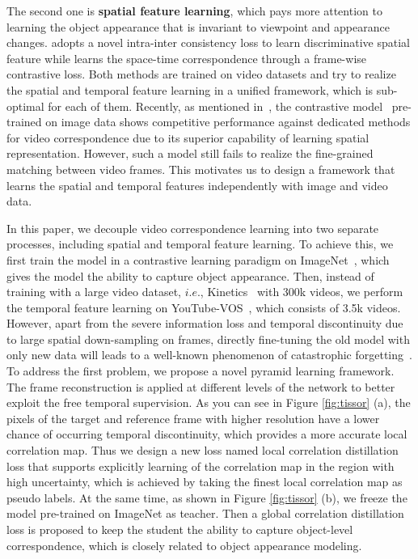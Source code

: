 \documentclass{article}
\begin{document}
The second one is \textbf{spatial feature learning}, which pays more attention to learning the object appearance that is invariant to viewpoint and appearance changes. \cite{wang2020contrastive} adopts a novel intra-inter consistency loss to learn  discriminative spatial feature while \cite{xu2021rethinking} learns the space-time correspondence through a frame-wise contrastive loss. Both methods are trained on video datasets and try to realize the spatial and temporal feature learning in a unified framework, which is sub-optimal for each of them. Recently, as mentioned in~\cite{wang2021different}, the contrastive model~\cite{he2020momentum}\cite{xie2021detco} pre-trained on image data shows competitive performance against dedicated methods for video correspondence due to its superior capability of learning spatial representation. However,  such a model still fails to realize the fine-grained matching between video frames. This motivates us to design a framework that learns the spatial and temporal features independently with image and video data.  

In this paper, we decouple video correspondence learning into two separate processes, including spatial and temporal feature learning. To achieve this, we first train the model in a contrastive learning paradigm on ImageNet~\cite{deng2009large}, which gives the model the ability to capture object appearance. Then, instead of training with a large video dataset, $i.e.$, Kinetics~\cite{carreira2017quo} with 300k videos, we perform the temporal feature learning on YouTube-VOS~\cite{xu2018youtube}, which consists of 3.5k videos. However, apart from the severe information loss and temporal discontinuity due to large spatial down-sampling on frames, directly fine-tuning the old model with only new data will leads to a well-known phenomenon of catastrophic forgetting~\cite{li2017learning}. To address the first problem, we propose a novel pyramid learning framework. The frame reconstruction is applied at different levels of the network to better exploit the free temporal supervision. As you can see in Figure \ref{fig:tissor} (a), the pixels of the target and reference frame with higher resolution have a lower chance of occurring temporal discontinuity, which provides a more accurate local correlation map. Thus we design a new loss named local correlation distillation loss that supports explicitly learning of the correlation map in the region with high uncertainty, which is achieved by taking the finest local correlation map as pseudo labels. At the same time, as shown in Figure \ref{fig:tissor} (b), we freeze the model pre-trained on ImageNet as teacher. Then a global correlation distillation loss is proposed to keep the student the ability to capture object-level correspondence, which is closely related to object appearance modeling. 
\end{document}
